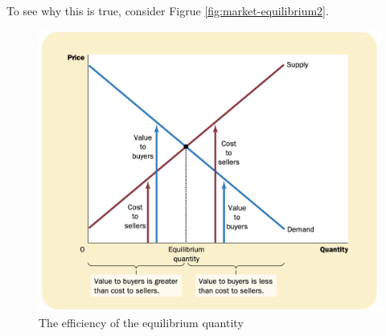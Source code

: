 To see why this is true, consider Figrue \ref{fig:market-equilibrium2}.

\begin{figure}[!ht]
  \centering
  \includegraphics[width=\textwidth]{pics/market-equilibrium2}
  \caption[Efficiency]{The efficiency of the equilibrium quantity}
  \label{fig:market-equilibirum2}
\end{figure}